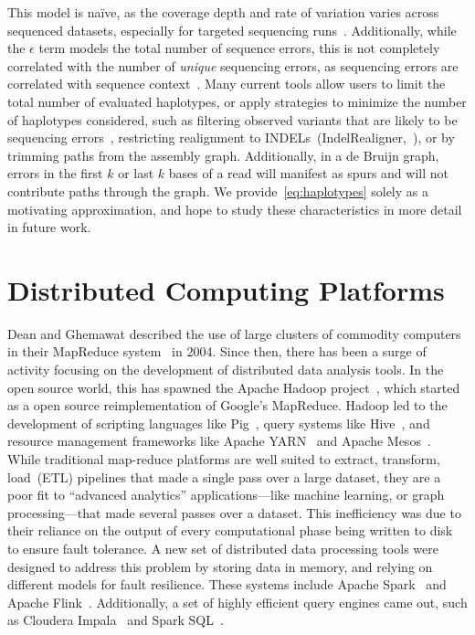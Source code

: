 \documentclass[phd]{ucbthesis}
\begin{document}
This model is na\"{i}ve, as the coverage depth and rate of variation varies across sequenced datasets,
especially for targeted sequencing runs~\cite{fang14}. Additionally, while the $\epsilon$ term models the
total number of sequence errors, this is not completely correlated with the number of \emph{unique}
sequencing errors, as sequencing errors are correlated with sequence context~\cite{depristo11}. Many
current tools allow users to limit the total number of evaluated haplotypes, or apply strategies to minimize
the number of haplotypes considered, such as filtering observed variants that are likely to be sequencing
errors~\cite{garrison12}, restricting realignment to INDELs~({IndelRealigner},~\cite{depristo11}), or
by trimming paths from the assembly graph. Additionally, in a de Bruijn graph, errors in the
first $k$ or last $k$ bases of a read will manifest as spurs and will not contribute paths through the graph. We provide~\eqref{eq:haplotypes} solely as a motivating
approximation, and hope to study these characteristics in more detail in future work.

\section{Distributed Computing Platforms}
\label{sec:distributed-computing}

Dean and Ghemawat described the use of large clusters of commodity computers in their
{MapReduce} system~\cite{dean04, dean08} in 2004. Since then, there has
been a surge of activity focusing on the development of distributed data
analysis tools. In the open source world, this has spawned the {Apache
  Hadoop} project~\cite{hadoop}, which started as a open source reimplementation
of Google's {MapReduce}. {Hadoop} led to the development of
scripting languages like {Pig}~\cite{olston08}, query systems like
{Hive}~\cite{thusoo09}, and resource management frameworks like
Apache {YARN}~\cite{vavilapalli13} and Apache {Mesos}~\cite{hindman11}. While
traditional map-reduce platforms are well suited to extract, transform,
load~(ETL) pipelines that made a single pass over a large dataset, they are
a poor fit to ``advanced analytics'' applications---like machine learning, or
graph processing---that made several passes over a dataset. This inefficiency was due to
their reliance on the output of every computational phase being written to
disk to ensure fault tolerance. A new set of distributed data processing tools
were designed to address this problem by storing data in memory, and relying
on different models for fault resilience. These systems include
Apache {Spark}~\cite{zaharia10, zaharia12} and Apache {Flink}~\cite{carbone15}.
Additionally, a set of highly efficient query engines came out, such as
{Cloudera Impala}~\cite{kornacker15} and {Spark
  SQL}~\cite{armbrust15}.
\end{document}
